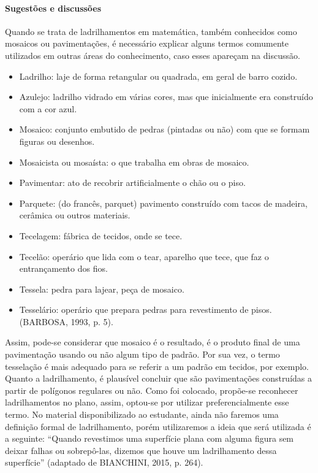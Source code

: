 \def\currentcolor{session1}
\begin{texto}
{


	\paragraph {Sugestões e discussões}
	Quando se trata de ladrilhamentos em matemática, também conhecidos como mosaicos ou pavimentações, é necessário explicar alguns termos comumente utilizados em outras áreas do conhecimento, caso esses apareçam na discussão.

	\begin{itemize}
	\item Ladrilho: laje de forma retangular ou quadrada, em geral de barro cozido.
	\item Azulejo: ladrilho vidrado em várias cores, mas que inicialmente era construído com a cor azul.
	\item Mosaico: conjunto embutido de pedras (pintadas ou não) com que se formam figuras ou desenhos.
	\item Mosaicista ou mosaísta: o que trabalha em obras de mosaico.
	\item Pavimentar: ato de recobrir artificialmente o chão ou o piso.
	\item Parquete: (do francês, parquet) pavimento construído com tacos de madeira, cerâmica ou outros materiais.
	\item Tecelagem: fábrica de tecidos, onde se tece.
	\item Tecelão: operário que lida com o tear, aparelho que tece, que faz o entrançamento dos fios. 
	\item Tessela: pedra para lajear, peça de mosaico.
	\item Tesselário: operário que prepara pedras para revestimento de pisos. (BARBOSA, 1993, p. 5).
	\end{itemize}

	Assim, pode-se considerar que mosaico é o resultado, é o produto final de uma pavimentação usando ou não algum tipo de padrão. Por sua vez, o termo tesselação é mais adequado para se referir a um padrão em tecidos, por exemplo. Quanto a ladrilhamento, é plausível concluir que são pavimentações construídas a partir de  polígonos regulares ou não.  Como foi colocado, propõe-se reconhecer ladrilhamentos no plano, assim, optou-se por utilizar preferencialmente esse termo. 
	No material disponibilizado ao estudante, ainda não faremos uma definição formal de ladrilhamento, porém utilizaremos a ideia que será utilizada é a seguinte: “Quando revestimos uma superfície plana com alguma figura sem deixar falhas ou sobrepô-las, dizemos que houve um ladrilhamento dessa superfície” (adaptado de BIANCHINI, 2015, p. 264).

}
\end{texto}
